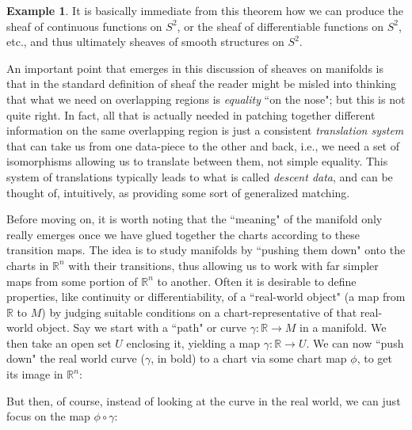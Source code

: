 \documentclass[11pt]{book}
\theoremstyle{definition}
\newtheorem{example}{Example}[section]
\theoremstyle{definition}
\theoremstyle{definition}
\theoremstyle{theorem}
\theoremstyle{definition}
\begin{document}
\begin{example}
		It is basically immediate from this theorem how we can produce the sheaf of continuous functions on $S^2$, or the sheaf of differentiable functions on $S^2$, etc., and thus ultimately sheaves of smooth structures on $S^2$. \par
	An important point that emerges in this discussion of sheaves on manifolds is that in the standard definition of sheaf the reader might be misled into thinking that what we need on overlapping regions is \textit{equality} ``on the nose"; but this is not quite right. In fact, all that is actually needed in patching together different information on the same overlapping region is just a consistent \textit{translation system} that can take us from one data-piece to the other and back, i.e., we need a set of isomorphisms allowing us to translate between them, not simple equality. This system of translations typically leads to what is called \textit{descent data}, and can be thought of, intuitively, as providing some sort of generalized matching. \par     
	Before moving on, it is worth noting that the ``meaning" of the manifold only really emerges once we have glued together the charts according to these transition maps. The idea is to study manifolds by ``pushing them down" onto the charts in $\mathbb{R}^n$ with their transitions, thus allowing us to work with far simpler maps from some portion of $\mathbb{R}^n$ to another. Often it is desirable to define properties, like continuity or differentiability, of a ``real-world object" (a map from $\mathbb{R}$ to $M$) by judging suitable conditions on a chart-representative of that real-world object. Say we start with a ``path" or curve $\gamma: \mathbb{R} \rightarrow M$ in a manifold. We then take an open set $U$ enclosing it, yielding a map $\gamma: \mathbb{R} \rightarrow U$. We can now ``push down" the real world curve ($\gamma$, in bold) to a chart via some chart map $\phi$, to get its image in $\mathbb{R}^n$: 
	\begin{center}  
	\end{center}  
	But then, of course, instead of looking at the curve in the real world, we can just focus on the map $\phi \circ \gamma$: 
	\begin{center}  
		\begin{tikzcd}

\end{tikzcd}
\end{center}
\end{example}
\end{document}
